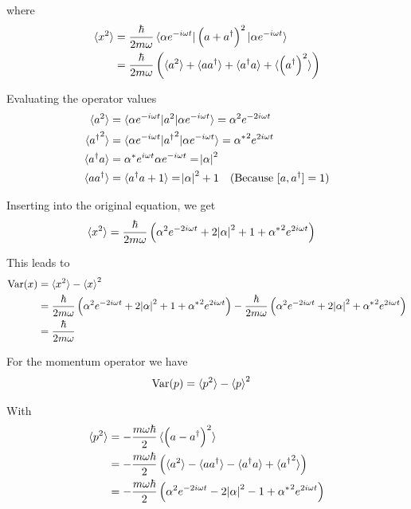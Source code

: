 \documentclass[a4paper,german,12pt,smallheadings]{scrartcl}
\begin{document}
\begin{enumerate}[a)]
    where
    \begin{align*}
      \braket{x^2} &= \frac{\hbar}{2 m \omega} \braket{\alpha e^{-i \omega t}|\del{a + a^\dagger}^2|\alpha e^{-i \omega t}} \\
                   &= \frac{\hbar}{2 m \omega} \del{\braket{a^2} + \braket{aa^\dagger} + \braket{a^\dagger a} + \braket{\del{a^\dagger}^2}}
    \end{align*}

    Evaluating the operator values
    \begin{align*}
      \braket{a^2} &= \braket{\alpha e^{-i \omega t}|a^2|\alpha e^{-i \omega t}} = \alpha^2 e^{-2i \omega t} \\
      \braket{{a^\dagger}^2} &= \braket{\alpha e^{-i \omega t}|{a^\dagger}^2|\alpha e^{-i \omega t}} = {\alpha^*}^2 e^{2i \omega t} \\
      \braket{a^\dagger a} &= \alpha^* e^{i \omega t} \alpha e^{-i \omega t} = \envert{\alpha}^2 \\
      \braket{aa^\dagger} &= \braket{a^\dagger a + 1} = \envert{\alpha}^2 + 1
      \quad \text{(Because $[a, a^\dagger] = 1$)} \\
    \end{align*}

    Inserting into the original equation, we get
    \begin{align*}
      \braket{x^2} &= \frac{\hbar}{2 m \omega} \del{\alpha^2 e^{-2i \omega t} + 2\envert{\alpha}^2 + 1 + {\alpha^*}^2 e^{2 i \omega t}}
    \end{align*}

    This leads to
    \begin{align*}
      \operatorname{Var}(x) &= \braket{x^2} - \braket{x}^2 \\
                            &= \frac{\hbar}{2 m \omega} \del{\alpha^2 e^{-2i \omega t} + 2\envert{\alpha}^2 + 1 + {\alpha^*}^2 e^{2 i \omega t}} -
                               \frac{\hbar}{2 m \omega} \del{\alpha^2 e^{-2i \omega t} + 2\envert{\alpha}^2 + {\alpha^*}^2 e^{2 i \omega t}} \\
                            &= \frac{\hbar}{2 m \omega}
    \end{align*}

    For the momentum operator we have
    \begin{align*}
      \operatorname{Var}(p) &= \braket{p^2} - \braket{p}^2
    \end{align*}

    With
    \begin{align*}
      \braket{p^2} &= - \frac{m \omega \hbar}{2} \braket{\del{a - a^\dagger}^2} \\
                   &= - \frac{m \omega \hbar}{2} \del{\braket{a^2} - \braket{aa^\dagger} - \braket{a^\dagger a} + \braket{{a^\dagger}^2}} \\
                   &= - \frac{m \omega \hbar}{2} \del{\alpha^2 e^{-2i \omega t} - 2\envert{\alpha}^2 - 1 + {\alpha^*}^2 e^{2 i \omega t}}
    \end{align*}


\end{enumerate}
\end{document}
